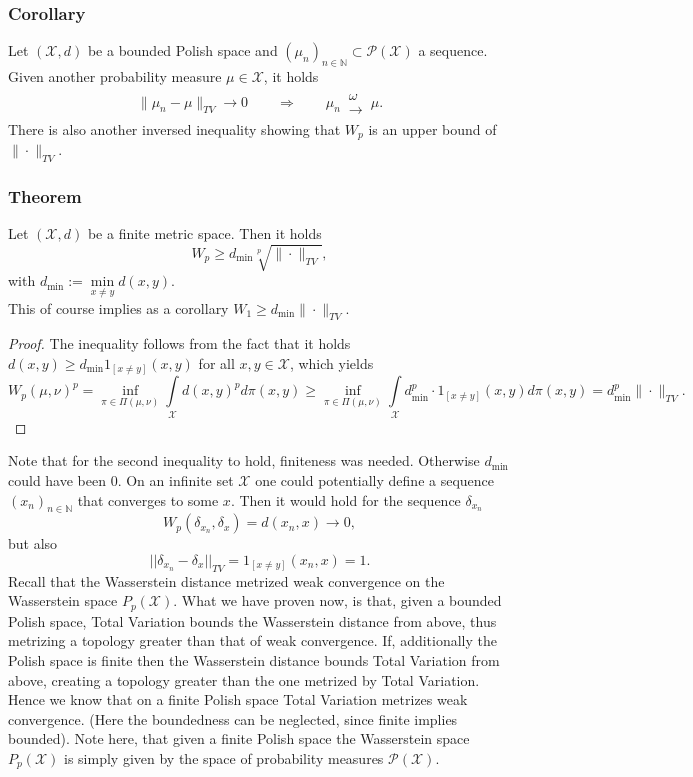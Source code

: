 \documentclass[11pt,a4paper]{article}
\begin{document}
\subsubsection{Corollary}
Let $(\mathcal{X},d)$ be a bounded Polish space and $(\mu_n)_{n\in\mathbb{N}}\subset\mathcal{P(X)}$ a sequence. Given another probability measure $\mu\in\mathcal{X}$, it holds 
\begin{align*}
\|\mu_n-\mu\|_{TV}\longrightarrow{}0\qquad \Longrightarrow \qquad \mu_n\,\substack{\omega \\ \longrightarrow}\,\mu.
\end{align*}
There is also another inversed inequality showing that $W_p$ is an upper bound of $\|\cdot\|_{TV}$. 
\subsubsection{Theorem}
Let $(\mathcal{X},d)$ be a finite metric space. Then it holds 
\[
W_p\geq{}d_{\text{min}}\sqrt[p]{\|\cdot{}\|_{TV}},
\]
with $d_{\text{min}}:=\min\limits_{x\neq{}y}d(x,y)$.\\ 
This of course implies as a corollary $W_1\geq{}d_{\text{min}}\|\cdot\|_{TV}.$
\begin{proof}
The inequality follows from the fact that it holds $d(x,y)\geq{}d_{\text{min}}1_{[x\neq{}y]}(x,y)$ for all $x,y\in\mathcal{X}$, which yields
\[
W_p(\mu,\nu)^p=\inf\limits_{\pi\in\Pi(\mu,\nu)}\int\limits_{\mathcal{X}}d(x,y)^pd\pi(x,y)\geq \inf\limits_{\pi\in\Pi(\mu,\nu)}\int\limits_{\mathcal{X}}d_{\text{min}}^p\cdot{}1_{[x\neq{}y]}(x,y)d\pi(x,y) = d_{\text{min}}^p\|\cdot{}\|_{TV}.
\]
\end{proof}
\noindent{}Note that for the second inequality to hold, finiteness was needed. Otherwise $d_{\text{min}}$ could have been 0. On an infinite set $\mathcal{X}$ one could potentially define a sequence $(x_n)_{n\in\mathbb{N}}$ that converges to some $x$. Then it would hold for the sequence $\delta_{x_n}$ 
\[
W_p(\delta_{x_n},\delta_x) = d(x_n,x)\longrightarrow 0,
\]
but also
\[
||\delta_{x_n}-\delta_x{}||_{TV} = 1_{[x\neq{}y]}(x_n,x) = 1.
\]
Recall that the Wasserstein distance metrized weak convergence on the Wasserstein space $P_p(\mathcal{X})$. What we have proven now, is that, given a bounded Polish space, Total Variation bounds the Wasserstein distance from above, thus metrizing a topology greater than that of weak convergence. If, additionally the Polish space is finite then the Wasserstein distance bounds Total Variation from above, creating a topology greater than the one metrized by Total Variation. Hence we know that on a finite Polish space Total Variation metrizes weak convergence. (Here the boundedness can be neglected, since finite implies bounded). Note here, that given a finite Polish space the Wasserstein space $P_p(\mathcal{X})$ is simply given by the space of probability measures $\mathcal{P(X)}$.\vspace{3em}\\
\end{document}
